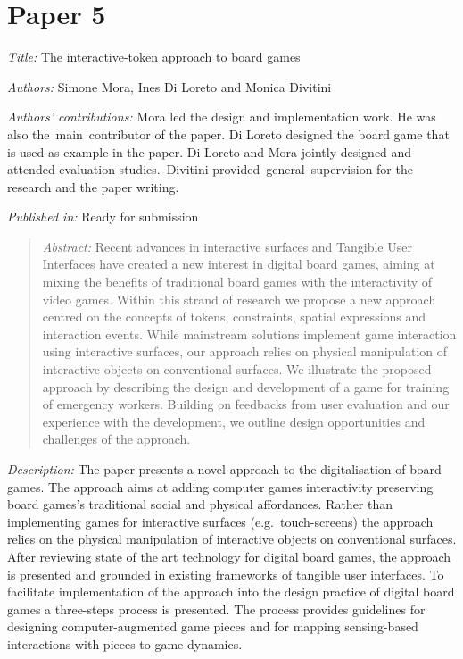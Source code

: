 \section[The interactive-token approach to board games]{Paper 5}\label{paper-5}

\emph{Title:} The interactive-token approach to board games

\emph{Authors:} Simone Mora, Ines Di Loreto and Monica Divitini

\emph{Authors' contributions:} Mora led the design and implementation work. He was also the~main~contributor of the paper. Di Loreto designed the board game that is used as example in the paper. Di Loreto and Mora jointly designed and attended evaluation studies.~Divitini provided~general~supervision for the research and the paper writing.

\emph{Published in:} Ready for submission 
\begin{quote}
	\emph{Abstract:} Recent advances in interactive surfaces and Tangible User Interfaces have created a new interest in digital board games, aiming at mixing the benefits of traditional board games with the interactivity of video games. Within this strand of research we propose a new approach centred on the concepts of tokens, constraints, spatial expressions and interaction events. While mainstream solutions implement game interaction using interactive surfaces, our approach relies on physical manipulation of interactive objects on conventional surfaces. We illustrate the proposed approach by describing the design and development of a game for training of emergency workers. Building on feedbacks from user evaluation and our experience with the development, we outline design opportunities and challenges of the approach. 
\end{quote}

\emph{Description:} The paper presents a novel approach to the digitalisation of board games. The approach aims at adding computer games interactivity preserving board games's traditional social and physical affordances. Rather than implementing games for interactive surfaces (e.g.~touch-screens) the approach relies on the physical manipulation of interactive objects on conventional surfaces. After reviewing state of the art technology for digital board games, the approach is presented and grounded in existing frameworks of tangible user interfaces. To facilitate implementation of the approach into the design practice of digital board games a three-steps process is presented. The process provides guidelines for designing computer-augmented game pieces and for mapping sensing-based interactions with pieces to game dynamics.

